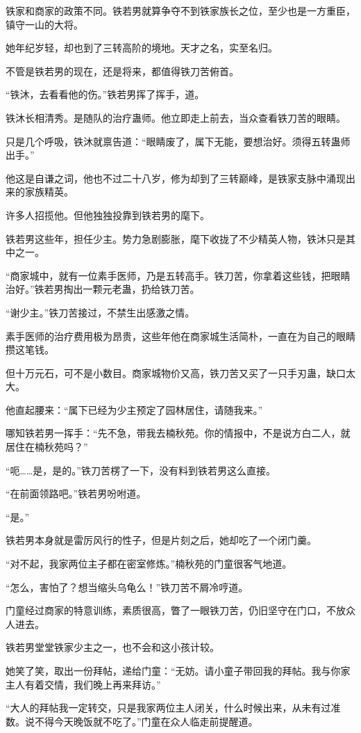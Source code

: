 \begin{this_body}
铁家和商家的政策不同。铁若男就算争夺不到铁家族长之位，至少也是一方重臣，镇守一山的大将。

她年纪岁轻，却也到了三转高阶的境地。天才之名，实至名归。

不管是铁若男的现在，还是将来，都值得铁刀苦俯首。

“铁沐，去看看他的伤。”铁若男挥了挥手，道。

铁沐长相清秀。是随队的治疗蛊师。他立即走上前去，当众查看铁刀苦的眼睛。

只是几个呼吸，铁沐就禀告道：“眼睛废了，属下无能，要想治好。须得五转蛊师出手。”

他这是自谦之词，他也不过二十八岁，修为却到了三转巅峰，是铁家支脉中涌现出来的家族精英。

许多人招揽他。但他独独投靠到铁若男的麾下。

铁若男这些年，担任少主。势力急剧膨胀，麾下收拢了不少精英人物，铁沐只是其中之一。

“商家城中，就有一位素手医师，乃是五转高手。铁刀苦，你拿着这些钱，把眼睛治好。”铁若男掏出一颗元老蛊，扔给铁刀苦。

“谢少主。”铁刀苦接过，不禁生出感激之情。

素手医师的治疗费用极为昂贵，这些年他在商家城生活简朴，一直在为自己的眼睛攒这笔钱。

但十万元石，可不是小数目。商家城物价又高，铁刀苦又买了一只手刃蛊，缺口太大。

他直起腰来：“属下已经为少主预定了园林居住，请随我来。”

哪知铁若男一挥手：“先不急，带我去楠秋苑。你的情报中，不是说方白二人，就居住在楠秋苑吗？”

“呃……是，是的。”铁刀苦楞了一下，没有料到铁若男这么直接。

“在前面领路吧。”铁若男吩咐道。

“是。”

铁若男本身就是雷厉风行的性子，但是片刻之后，她却吃了一个闭门羹。

“对不起，我家两位主子都在密室修炼。”楠秋苑的门童很客气地道。

“怎么，害怕了？想当缩头乌龟么！”铁刀苦不屑冷哼道。

门童经过商家的特意训练，素质很高，瞥了一眼铁刀苦，仍旧坚守在门口，不放众人进去。

铁若男堂堂铁家少主之一，也不会和这小孩计较。

她笑了笑，取出一份拜帖，递给门童：“无妨。请小童子带回我的拜帖。我与你家主人有着交情，我们晚上再来拜访。”

“大人的拜帖我一定转交，只是我家两位主人闭关，什么时候出来，从未有过准数。说不得今天晚饭就不吃了。”门童在众人临走前提醒道。


\end{this_body}
